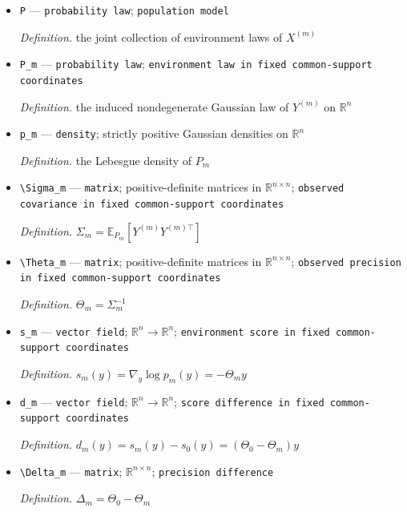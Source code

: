 \documentclass{article}
\begin{document}
\begin{itemize}
  \item \texttt{P} --- \texttt{probability law}; \texttt{population model}
  \par\smallskip\noindent\emph{Definition.} the joint collection of environment laws of \(X^{(m)}\)
  \item \texttt{P\_\allowbreak{}m} --- \texttt{probability law}; \texttt{environment law in fixed common-\allowbreak{}support coordinates}
  \par\smallskip\noindent\emph{Definition.} the induced nondegenerate Gaussian law of \(Y^{(m)}\) on \(\mathbb R^n\)
  \item \texttt{p\_\allowbreak{}m} --- \texttt{density}; strictly positive Gaussian densities on \(\mathbb R^n\)
  \par\smallskip\noindent\emph{Definition.} the Lebesgue density of \(P_m\)
  \item \texttt{\textbackslash{}\allowbreak{}Sigma\_\allowbreak{}m} --- \texttt{matrix}; positive-definite matrices in \(\mathbb R^{n\times n}\); \texttt{observed covariance in fixed common-\allowbreak{}support coordinates}
  \par\smallskip\noindent\emph{Definition.} \(\Sigma_m=\mathbb E_{P_m}[Y^{(m)}Y^{(m)\top}]\)
  \item \texttt{\textbackslash{}\allowbreak{}Theta\_\allowbreak{}m} --- \texttt{matrix}; positive-definite matrices in \(\mathbb R^{n\times n}\); \texttt{observed precision in fixed common-\allowbreak{}support coordinates}
  \par\smallskip\noindent\emph{Definition.} \(\Theta_m=\Sigma_m^{-1}\)
  \item \texttt{s\_\allowbreak{}m} --- \texttt{vector field}; \(\mathbb R^n\to\mathbb R^n\); \texttt{environment score in fixed common-\allowbreak{}support coordinates}
  \par\smallskip\noindent\emph{Definition.} \(s_m(y)=\nabla_y\log p_m(y)=-\Theta_my\)
  \item \texttt{d\_\allowbreak{}m} --- \texttt{vector field}; \(\mathbb R^n\to\mathbb R^n\); \texttt{score difference in fixed common-\allowbreak{}support coordinates}
  \par\smallskip\noindent\emph{Definition.} \(d_m(y)=s_m(y)-s_0(y)=(\Theta_0-\Theta_m)y\)
  \item \texttt{\textbackslash{}\allowbreak{}Delta\_\allowbreak{}m} --- \texttt{matrix}; \(\mathbb R^{n\times n}\); \texttt{precision difference}
  \par\smallskip\noindent\emph{Definition.} \(\Delta_m=\Theta_0-\Theta_m\)

\end{itemize}
\end{document}
